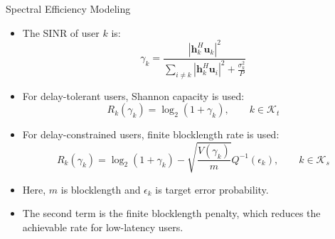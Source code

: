 \documentclass{beamer}
\begin{document}
\begin{frame}{Spectral Efficiency Modeling}

\begin{itemize}
    \item The SINR of user $k$ is:
    \[
        \gamma_k =
        \frac{
        |\mathbf{h}_k^H \mathbf{u}_k|^2
        }{
        \sum_{i\neq k}|\mathbf{h}_k^H \mathbf{u}_i|^2
        +
        \frac{\sigma_k^2}{P}
        }
    \]

    \item For delay-tolerant users, Shannon capacity is used:
    \[
        R_k(\gamma_k)=\log_2(1+\gamma_k),
        \qquad k\in \mathcal{K}_t
    \]

    \item For delay-constrained users, finite blocklength rate is used:
    \[
        R_k(\gamma_k)
        =
        \log_2(1+\gamma_k)
        -
        \sqrt{\frac{V(\gamma_k)}{m}}Q^{-1}(\epsilon_k),
        \qquad k\in \mathcal{K}_s
    \]

    \item Here, $m$ is blocklength and $\epsilon_k$ is target error probability.

    \item The second term is the finite blocklength penalty, which reduces the achievable rate for low-latency users.

\end{itemize}

\end{frame}
\end{document}
